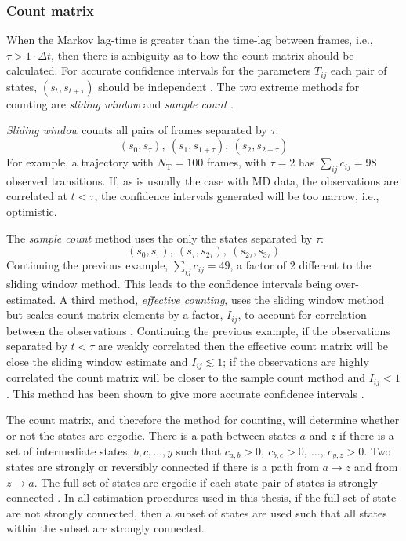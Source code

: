 \subsubsection{Count matrix}\label{sec:theory_count_mat}
When the Markov lag-time is greater than the time-lag between frames, i.e., $\tau > 1\cdot \Delta t$, then there is ambiguity as to how the count matrix should be calculated. For accurate confidence intervals for the parameters $T_{ij}$ each pair of states, $(s_{t}, s_{t+\tau})$ should be independent \cite{trendelkamp-schroerEstimationUncertaintyReversible2015b}. The two extreme methods for counting are \emph{sliding window} and \emph{sample count} \cite{trendelkamp-schroerEstimationUncertaintyReversible2015b}. 

\emph{Sliding window} counts all pairs of frames separated by $\tau$: 
\begin{equation*}
    (s_0, s_{\tau}),\ (s_1, s_{1+\tau}),\ (s_2, s_{2+\tau})
\end{equation*}
For example, a trajectory with $N_{\mathrm{T}}=100$ frames, with $\tau=2$ has $\sum_{ij}c_{ij}=98$ observed transitions. If, as is usually the case with MD data, the observations are correlated at $t < \tau$, the confidence intervals generated will be too narrow, i.e., optimistic. 

The \emph{sample count} method uses the only the states separated by $\tau$:
\begin{equation*}
    (s_{0}, s_{\tau}),\ (s_{\tau}, s_{2\tau}),\ (s_{2\tau}, s_{3\tau})
\end{equation*}
Continuing the previous example, $\sum_{ij}c_{ij}=49$, a factor of $2$ different to the sliding window method. This leads to the confidence intervals being over-estimated. A third method, \emph{effective counting}, uses the sliding window method but scales count matrix elements by a factor, $I_{ij}$, to account for correlation between the observations \cite{noeStatisticalInefficiencyMarkov,trendelkamp-schroerEstimationUncertaintyReversible2015b}. Continuing the previous example, if the observations separated by $t<\tau$ are weakly correlated then the effective count matrix will be close the sliding window estimate and $I_{ij} \lesssim 1$; if the observations are highly correlated the count matrix will be closer to the sample count method and $I_{ij}<1$. This method has been shown to give more accurate confidence intervals \cite{trendelkamp-schroerEstimationUncertaintyReversible2015b}. 

The count matrix, and therefore the method for counting,  will determine whether or not the states are ergodic. There is a path between states $a$ and $z$ if there is a set of intermediate states, $b, c, \ldots, y$ such that $c_{a,b}>0,\ c_{b, c}>0,\ \ldots,\ c_{y, z}>0$. Two states are strongly or reversibly connected if there is a path from $a\rightarrow z$ and from $z\rightarrow a$. The full set of states are ergodic if each state pair of states is strongly connected \cite{wilson1996introduction}. In all estimation procedures used in this thesis, if the full set of state are not strongly connected, then a subset of states are used such that all states within the subset are strongly connected.

